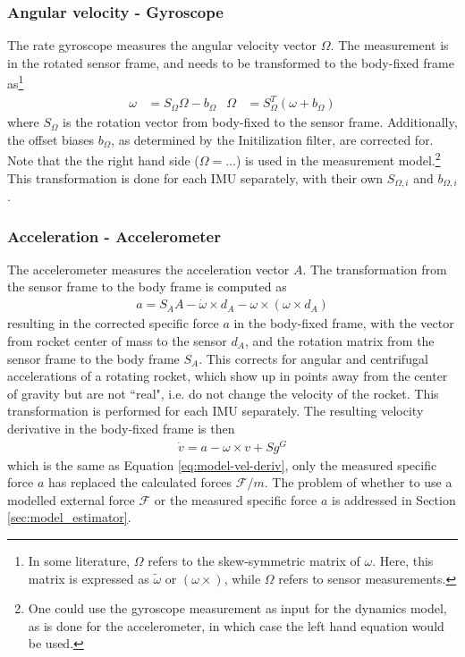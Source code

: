 \subsubsection{Angular velocity - Gyroscope}
The rate gyroscope measures the angular velocity vector $\Omega$. 
The measurement is in the rotated sensor frame, and needs to be transformed to the  body-fixed frame as\footnote{In some literature, $\Omega$ refers to the skew-symmetric matrix of $\omega$. Here, this matrix is expressed as $\tilde \omega$ or $(\omega \times)$, while $\Omega$ refers to sensor measurements.}
\begin{align}
    \omega &= S_\Omega \Omega - b_\Omega
    &
    \Omega &= S_\Omega^T (\omega + b_\Omega)
    \label{eq:meas-gyro}
\end{align}
where $S_\Omega$ is the rotation vector from body-fixed to the sensor frame.
Additionally, the offset biases $b_\Omega$, as determined by the Initilization filter, are corrected for.
Note that the the right hand side ($\Omega = ...$) is used in the measurement model.\footnote{One could use the gyroscope measurement as input for the dynamics model, as is done for the accelerometer, in which case the left hand equation would be used.}
This transformation is done for each IMU separately, with their own $S_{\Omega, i}$ and $b_{\Omega, i}$.

\subsubsection{Acceleration - Accelerometer}
The accelerometer measures the acceleration vector $A$.
The transformation from the sensor frame to the body frame is computed as \cite{stevens2015}
\begin{align}
    a = S_A A - \dot \omega \times d_A - \omega \times (\omega \times d_A)
    \label{eq:meas-accel}
\end{align}
resulting in the corrected specific force $a$ in the body-fixed frame, with the vector from rocket center of mass to the sensor $d_A$, and the rotation matrix from the sensor frame to the body frame $S_A$.
This corrects for angular and centrifugal accelerations of a rotating rocket, which show up in points away from the center of gravity but are not ``real", i.e. do not change the velocity of the rocket. 
This transformation is performed for each IMU separately.
The resulting velocity derivative in the body-fixed frame is then \cite{zipfel2007, stevens2015}
\begin{align}
    \dot v = a - \omega \times v + S g^G
    \label{eq:meas-veldot}
\end{align}
which is the same as Equation \ref{eq:model-vel-deriv}, only the measured specific force $a$ has replaced the calculated forces $\mathcal{F}/m$.
The problem of whether to use a modelled external force $\mathcal{F}$ or the measured specific force $a$ is addressed in Section \ref{sec:model_estimator}.

